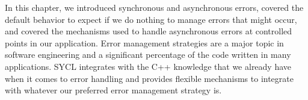 In this chapter, we introduced synchronous and asynchronous errors, covered the default behavior to expect if we do nothing to manage errors that might occur, and covered the mechanisms used to handle asynchronous errors at controlled points in our application. Error management strategies are a major topic in software engineering and a significant percentage of the code written in many applications. SYCL integrates with the C++ knowledge that we already have when it comes to error handling and provides flexible mechanisms to integrate with whatever our preferred error management strategy is.\par


\newpage